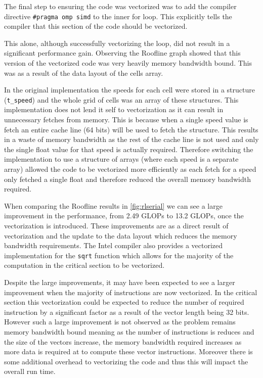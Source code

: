 \documentclass{article}
\begin{document}
\begin{multicols}{2}
The final step to ensuring the code was vectorized was to add the compiler
directive \verb|#pragma omp simd| to the inner for loop. This explicitly tells
the compiler that this section of the code should be vectorized. 

This alone, although successfully vectorizing the loop, did not result in a
significant performance gain. Observing the Roofline graph showed that this
version of the vectorized code was very heavily memory bandwidth bound. This
was as a result of the data layout of the cells array. 

In the original implementation the speeds for each cell were stored in a
structure (\verb|t_speed|) and the whole grid of cells was an array of these
structures. This implementation does not lend it self to vectorization as it
can result in unnecessary fetches from memory. This is because when a single
speed value is fetch an entire cache line (64 bits) will be used to fetch the
structure. This results in a waste of memory bandwidth as the rest of the
cache line is not used and only the single float value for that speed is actually
required. Therefore switching the implementation to use a structure of arrays
(where each speed is a separate array) allowed the code to be vectorized more
efficiently as each fetch for a speed only fetched a single float and therefore
reduced the overall memory bandwidth required. 

When comparing the Roofline results in \autoref{fig:rlserial} we can see a
large improvement in the performance, from 2.49 GLOPs to 13.2 GLOPs, once the
vectorization is introduced. These improvements are as a direct
result of vectorization and the update to the data layout which reduces the
memory bandwidth requirements. The Intel compiler also provides a vectorized
implementation for the \verb|sqrt| function which allows for the majority of
the computation in the critical section to be vectorized.

Despite the large improvements, it may have been expected to see a larger
improvement when the majority of instructions are now vectorized. In the
critical section this vectorization could be expected to reduce the number of
required instruction by a significant factor as a result of the vector length
being 32 bits. However such a large improvement is not observed as the problem
remains memory bandwidth bound meaning as the number of instructions is reduces
and the size of the vectors increase, the memory bandwidth required increases
as more data is required at to compute these vector instructions. Moreover
there is some additional overhead to vectorizing the code and thus this will
impact the overall run time.


\end{multicols}
\end{document}
